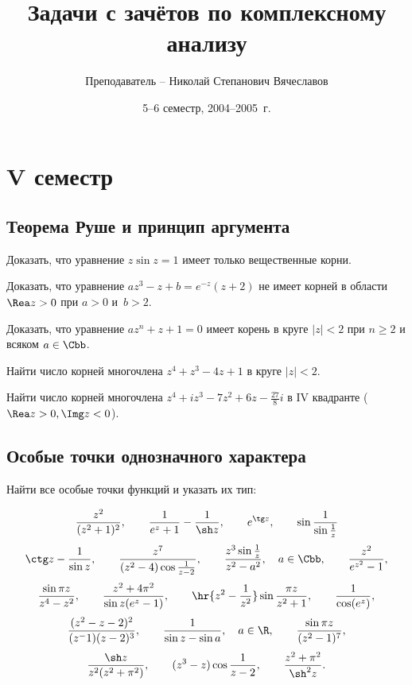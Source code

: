 \documentclass[a4paper]{article}
\title{Задачи с зачётов по комплексному анализу}
\author{Преподаватель -- Николай Степанович Вячеславов}
\date{5--6 семестр, 2004--2005~г.}
\begin{document}
\maketitle

\section{V семестр}

\subsection{Теорема Руше и принцип аргумента}

\begin{problem}
Доказать, что уравнение $z \sin z = 1$ имеет только вещественные корни.
\end{problem}

\begin{problem}
Доказать, что уравнение $az^3-z+b = e^{-z}(z+2)$ не имеет корней в области $\Rea z > 0$ при ${a>0}$ и~${b > 2}$.
\end{problem}

\begin{problem}
Доказать, что уравнение $az^n+z+1 = 0$ имеет корень в круге $|z|< 2$ при $n \ge 2$ и всяком $a \in \Cbb$.
\end{problem}

\begin{problem}
Найти число корней многочлена $z^4+z^3-4z+1$ в круге $|z| < 2$.
\end{problem}

\begin{problem}
Найти число корней многочлена $z^4+iz^3-7z^2+6z-\frac{27}{8}i$ в IV квадранте ($\Rea z > 0, \Img z < 0$).
\end{problem}

\subsection{Особые точки однозначного характера}

Найти все особые точки функций и указать их тип:

$$\frac{z^2}{(z^2+1)^2}, \qquad \frac{1}{e^z+1} - \frac{1}{\sh z}, \qquad e^{\tg z}, \qquad \sin\frac{1}{\sin\frac1z}$$
$$\ctg z - \frac{1}{\sin z}, \qquad \frac{z^7}{(z^2-4)\cos\frac1{z-2}}, \qquad \frac{z^3\sin\frac1z}{z^2-a^2}, \quad a \in \Cbb,\qquad \frac{z^2}{e^{z^2}-1},$$
$$\frac{\sin \pi z}{z^4-z^2}, \qquad \frac{z^2+4\pi^2}{\sin z(e^z-1)},\qquad \hr{z^2-\frac1{z^2}}\sin\frac{\pi z}{z^2+1},\qquad \frac{1}{\cos (e^z)},$$
$$\frac{(z^2-z-2)^2}{(z^-1)(z-2)^3},\qquad \frac{1}{\sin z - \sin a}, \quad a\in\R,\qquad \frac{\sin \pi z}{(z^2-1)^7},$$
$$\frac{\sh z}{z^2(z^2+\pi^2)},\qquad (z^3-z)\cos\frac{1}{z-2},\qquad \frac{z^2+\pi^2}{\sh^2z}.$$
\end{document}
